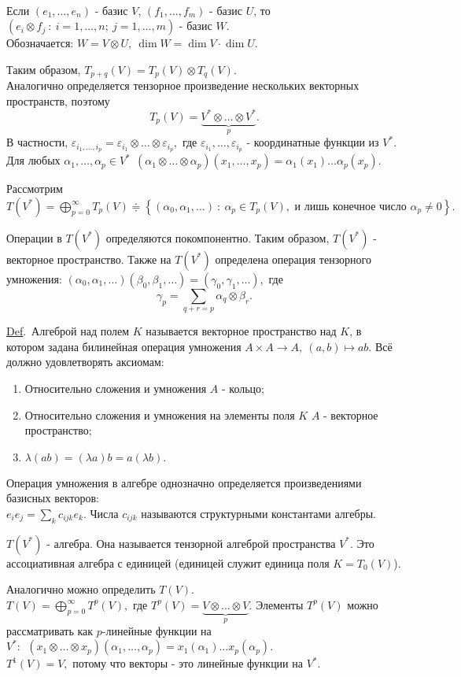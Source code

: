 \documentclass[a4paper]{article}%
\newcommand{\eps}{\varepsilon}
\renewcommand{\de}{\par\noindent\underline{Def}.\ }%
\renewcommand{\ab}{\par\noindent}%
\newcommand{\baz}[1]{\left(#1_1,\dots,#1_n\right)}%
\newcommand{\ty}{\otimes}
\begin{document}
\\
Если $\baz{e}$ - базис $V$, $(f_1,\dots,f_m)$ - базис $U$, то $(e_i\ty f_j\ :\ i=1,\dots,n;\ j=1,\dots,m)$ - базис $W$.
\\
Обозначается: $W=V\ty U,\ \dim W=\dim V\cdot\dim U.$
\ab
Таким образом, $T_{p+q}(V)=T_p(V)\ty T_q(V).$
\\
Аналогично определяется тензорное произведение нескольких векторных пространств, поэтому
$$T_p(V)=\underbrace{V^*\ty\dots\ty V^*}_p.$$
В частности, $\eps_{i_1,\dots,i_p}=\eps_{i_1}\ty\dots\ty\eps_{i_p},$ где $\eps_{i_1},\dots,\eps_{i_p}$ - координатные функции
из $V^*.$ Для любых $\alpha_1,\dots,\alpha_p\in V^*\ \ (\alpha_1\ty\dots\ty\alpha_p)(x_1,\dots,x_p)=\alpha_1(x_1)\dots\alpha_p(x_p).$
\ab Рассмотрим $T(V^*)=\bigoplus\limits_{p=0}^\infty T_p(V)\doteqdot\left\{(\alpha_0,\alpha_1,\dots)\ :\
\alpha_p\in T_p(V),\mbox{ и лишь конечное число }\alpha_p\ne 0\right\}.$
\ab Операции в $T(V^*)$ определяются покомпонентно. Таким образом, $T(V^*)$ - векторное пространство.
Также на $T(V^*)$ определена операция тензорного умножения:
$(\alpha_0,\alpha_1,\dots)(\beta_0,\beta_1,\dots)=(\gamma_0,\gamma_1,\dots),$ где
$$
\gamma_p=\sum_{q+r=p}\alpha_q\ty\beta_r.
$$
\de Алгеброй над полем $K$ называется векторное пространство над $K$, в котором задана билинейная операция
умножения $A\times A\rightarrow A,\ (a,b)\mapsto ab.$ Всё должно удовлетворять аксиомам:
\begin{enumerate}
    \item Относительно сложения и умножения $A$ - кольцо;
    \item Относительно сложения и умножения на элементы поля $K$ $A$ - векторное пространство;
    \item $\lambda(ab)=(\lambda a)b=a(\lambda b).$
\end{enumerate}
Операция умножения в алгебре однозначно определяется произведениями базисных векторов:\\
$e_ie_j=\sum\limits_kc_{ijk}e_k.$ Числа $c_{ijk}$ называются структурными константами алгебры.
\ab $T(V^*)$ - алгебра. Она называется тензорной алгеброй пространства $V^*$. Это ассоциативная алгебра
с единицей (единицей служит единица поля $K=T_0(V)$).
\ab Аналогично можно определить $T(V).$\\
$T(V)=\bigoplus\limits_{p=0}^\infty T^p(V),$ где $T^p(V)=\underbrace{V\ty\dots\ty V}_p.$ Элементы $T^p(V)$ можно
рассматривать как $p$-линейные функции на $V^*:\ \ (x_1\ty\dots\ty x_p)(\alpha_1,\dots,\alpha_p)=
x_1(\alpha_1)\dots x_p(\alpha_p).$\\
$T^1(V)=V,$ потому что векторы - это линейные функции на $V^*.$
\end{document}
